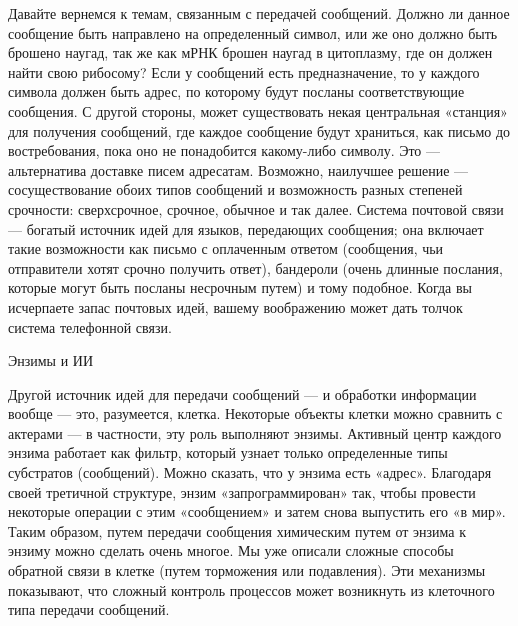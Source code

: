 \documentclass[../main.tex]{subfiles}
\begin{document}
Давайте вернемся к темам, связанным с передачей сообщений. Должно ли данное сообщение быть направлено на определенный символ, или же оно должно быть брошено наугад, так же как мРНК брошен наугад в цитоплазму, где он должен найти свою рибосому? Если у сообщений есть предназначение, то у каждого символа должен быть адрес, по которому будут посланы соответствующие сообщения. С другой стороны, может существовать некая центральная «станция» для получения сообщений, где каждое сообщение будут храниться, как письмо до востребования, пока оно не понадобится какому-либо символу. Это --- альтернатива доставке писем адресатам. Возможно, наилучшее решение --- сосуществование обоих типов сообщений и возможность разных степеней срочности: сверхсрочное, срочное, обычное и так далее. Система почтовой связи --- богатый источник идей для языков, передающих сообщения; она включает такие возможности как письмо с оплаченным ответом (сообщения, чьи отправители хотят срочно получить ответ), бандероли (очень длинные послания, которые могут быть посланы несрочным путем) и тому подобное. Когда вы исчерпаете запас почтовых идей, вашему воображению может дать толчок система телефонной связи.

Энзимы и ИИ

Другой источник идей для передачи сообщений --- и обработки информации вообще --- это, разумеется, клетка. Некоторые объекты клетки можно сравнить с актерами --- в частности, эту роль выполняют энзимы. Активный центр каждого энзима работает как фильтр, который узнает только определенные типы субстратов (сообщений). Можно сказать, что у энзима есть «адрес». Благодаря своей третичной структуре, энзим «запрограммирован» так, чтобы провести некоторые операции с этим «сообщением» и затем снова выпустить его «в мир». Таким образом, путем передачи сообщения химическим путем от энзима к энзиму можно сделать очень многое. Мы уже описали сложные способы обратной связи в клетке (путем торможения или подавления). Эти механизмы показывают, что сложный контроль процессов может возникнуть из клеточного типа передачи сообщений.
\end{document}
